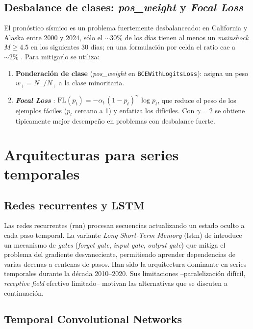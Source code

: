 \subsection{Desbalance de clases: \textit{pos\_weight} y \textit{Focal Loss}}
\label{desbalance}

El pronóstico sísmico es un problema fuertemente desbalanceado: en California y Alaska entre 2000 y 2024, sólo el $\sim 30\%$ de los días tienen al menos un \textit{mainshock} $M\geq 4.5$ en los siguientes \(30\) días; en una formulación por celda el ratio cae a $\sim 2\%$ \citep{he2009imbalanced}. Para mitigarlo se utiliza:
\begin{enumerate}
  \item \textbf{Ponderación de clase} (\textit{pos\_weight} en \texttt{BCEWithLogitsLoss}): asigna un peso $w_+ = N_-/N_+$ a la clase minoritaria.
  \item \textbf{\textit{Focal Loss}} \citep{lin2017focal}: \(\mathrm{FL}(p_t) = -\alpha_t\, (1 - p_t)^\gamma\, \log p_t\), que reduce el peso de los ejemplos fáciles ($p_t$ cercano a 1) y enfatiza los difíciles. Con $\gamma=2$ se obtiene típicamente mejor desempeño en problemas con desbalance fuerte.
\end{enumerate}

\section{Arquitecturas para series temporales}
\label{dl-temporal}

\subsection{Redes recurrentes y LSTM}

Las redes recurrentes (\gls{rnn}) procesan secuencias actualizando un estado oculto a cada paso temporal. La variante \emph{Long Short-Term Memory} (\gls{lstm}) de \citet{hochreiter1997lstm} introduce un mecanismo de \textit{gates} (\textit{forget gate}, \textit{input gate}, \textit{output gate}) que mitiga el problema del gradiente desvaneciente, permitiendo aprender dependencias de varias decenas a centenas de pasos. Han sido la arquitectura dominante en series temporales durante la década 2010--2020. Sus limitaciones --paralelización difícil, \textit{receptive field} efectivo limitado-- motivan las alternativas que se discuten a continuación.

\subsection{Temporal Convolutional Networks}
\label{tcn-marco}

